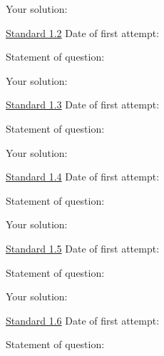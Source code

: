 \documentclass[12pt]{article}
\begin{document}
Your solution:

\newpage


\underline{Standard 1.2} \hspace{6cm} Date of first attempt:



\bigskip

Statement of question:

\vspace{1in}

Your solution:

\newpage


\underline{Standard 1.3} \hspace{6cm} Date of first attempt:



\bigskip

Statement of question:

\vspace{1in}

Your solution:

\newpage


\underline{Standard 1.4} \hspace{6cm} Date of first attempt:



\bigskip

Statement of question:

\vspace{1in}

Your solution:

\newpage


\underline{Standard 1.5} \hspace{6cm} Date of first attempt:



\bigskip

Statement of question:

\vspace{1in}

Your solution:

\newpage


\underline{Standard 1.6} \hspace{6cm} Date of first attempt:



\bigskip

Statement of question:
\end{document}
